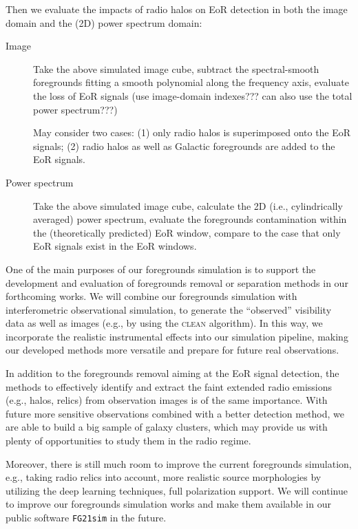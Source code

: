 \documentclass[modern]{aastex61}
\begin{document}
Then we evaluate the impacts of radio halos on EoR detection in both the
image domain and the (2D) power spectrum domain:
\begin{description}
  \item[Image]
    Take the above simulated image cube, subtract the spectral-smooth
    foregrounds fitting a smooth polynomial along the frequency axis,
    evaluate the loss of EoR signals (use image-domain indexes???
    can also use the total power spectrum???)

    May consider two cases: (1) only radio halos is superimposed onto the
    EoR signals; (2) radio halos as well as Galactic foregrounds are
    added to the EoR signals.

  \item[Power spectrum]
    Take the above simulated image cube, calculate the 2D
    (i.e., cylindrically averaged) power spectrum, evaluate the foregrounds
    contamination within the (theoretically predicted) EoR window,
    compare to the case that only EoR signals exist in the EoR windows.
\end{description}


One of the main purposes of our foregrounds simulation is to support
the development and evaluation of foregrounds removal or separation
methods in our forthcoming works.
We will combine our foregrounds simulation with interferometric
observational simulation, to generate the \enquote{observed} visibility
data as well as images (e.g., by using the \textsc{clean} algorithm).
In this way, we incorporate the realistic instrumental effects into
our simulation pipeline, making our developed methods more versatile
and prepare for future real observations.

In addition to the foregrounds removal aiming at the EoR signal
detection, the methods to effectively identify and extract the faint
extended radio emissions (e.g., halos, relics) from observation images
is of the same importance.
With future more sensitive observations combined with a better detection
method, we are able to build a big sample of galaxy clusters, which
may provide us with plenty of opportunities to study them in the radio
regime.

Moreover, there is still much room to improve the current foregrounds
simulation, e.g., taking radio relics into account, more realistic
source morphologies by utilizing the deep learning techniques,
full polarization support.
We will continue to improve our foregrounds simulation works and make
them available in our public software \texttt{FG21sim} in the future.
\end{document}

